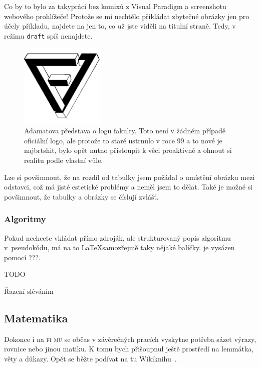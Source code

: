 Co by to bylo za takypráci bez komixů z Visual Paradigm a screenshotu webového
prohlížeče! Protože se mi nechtělo přikládat zbytečné obrázky jen pro účely
příkladu, najdete na  jen to, co už jste viděli na
titulní straně. Tedy, v režimu \texttt{draft} spíš nenajdete.

\begin{figure}[H]
    \centering
    \includegraphics[height=4cm]{logo_fi.pdf}
    \caption{Adamatova představa o logu fakulty. Toto není v žádném případě
    oficiální logo, ale protože to staré ustrnulo v roce 99 a to nové je
    najbrtshit, bylo opět nutno přistoupit k věci proaktivně a ohnout si realitu
    podle vlastní vůle.}
    \label{fig:example}
\end{figure}

Lze si povšimnout, že na rozdíl od tabulky jsem požádal o umístění obrázku
mezi odstavci, což má jisté estetické problémy a neměl jsem to dělat. Také je
možné si povšimnout, že tabulky a obrázky se číslují zvlášť.

\subsubsection{Algoritmy}

Pokud nechcete vkládat přímo zdroják, ale strukturovaný popis algoritmu
v~pseudokódu, má na to \LaTeX samozřejmě taky nějaké balíčky.
 je vysázen pomocí ???.

\begin{algorithm}[H]
TODO
\caption{Řazení sléváním}
\label{alg:example}
\end{algorithm}

\subsection{Matematika}

Dokonce i na \textsc{fi mu} se občas v závěrečných pracích vyskytne potřeba
sázet výrazy, rovnice nebo jinou matiku. K tomu bych přišoupnul ještě prostředí
na lemmátka, věty a důkazy. Opět se běžte podívat na tu Wikiknihu~\cite{wb}.


